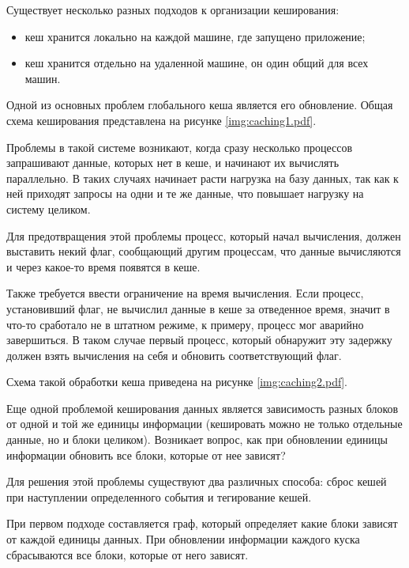 Существует несколько разных подходов к организации кеширования:
\begin{itemize}
	\item кеш хранится локально на каждой машине, где запущено приложение;
	\item кеш хранится отдельно на удаленной машине, он один общий для всех машин.
\end{itemize}

Одной из основных проблем глобального кеша является его обновление. Общая схема кеширования представлена на рисунке \ref{img:caching1.pdf}.


Проблемы в такой системе возникают, когда сразу несколько процессов запрашивают данные, которых нет в кеше, и начинают их вычислять параллельно. В таких случаях начинает расти нагрузка на базу данных, так как к ней приходят запросы на одни и те же данные, что повышает нагрузку на систему целиком.

Для предотвращения этой проблемы процесс, который начал вычисления, должен выставить некий флаг, сообщающий другим процессам, что данные вычисляются и через какое-то время появятся в кеше. 

Также требуется ввести ограничение на время вычисления. Если процесс, установивший флаг, не вычислил данные в кеше за отведенное время, значит в что-то сработало не в штатном режиме, к примеру, процесс мог аварийно завершиться. В таком случае первый процесс, который обнаружит эту задержку должен взять вычисления на себя и обновить соответствующий флаг.

Схема такой обработки кеша приведена на рисунке \ref{img:caching2.pdf}.


Еще одной проблемой кеширования данных является зависимость разных блоков от одной и той же единицы информации (кешировать можно не только отдельные данные, но и блоки целиком). Возникает вопрос, как при обновлении единицы информации обновить все блоки, которые от нее зависят?

Для решения этой проблемы существуют два различных способа: сброс кешей при наступлении определенного события и тегирование кешей.

При первом подходе составляется граф, который определяет какие блоки зависят от каждой единицы данных. При обновлении информации  каждого куска сбрасываются все блоки, которые от него зависят.

